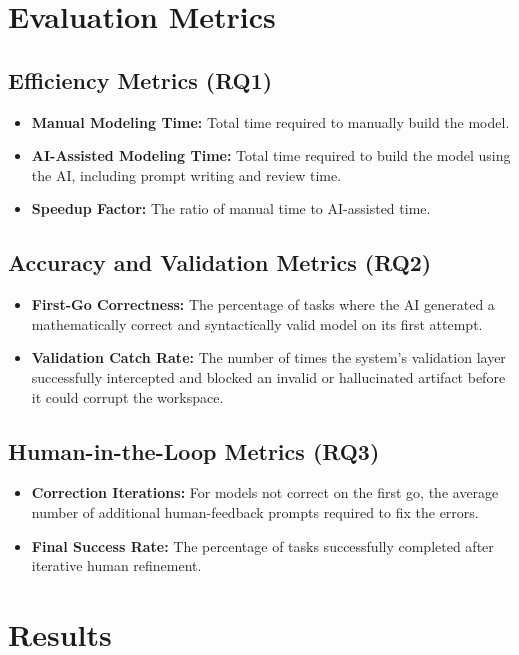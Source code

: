 \section{Evaluation Metrics}

\subsection{Efficiency Metrics (RQ1)}
\begin{itemize}
    \item \textbf{Manual Modeling Time:} Total time required to manually build the model.
    \item \textbf{AI-Assisted Modeling Time:} Total time required to build the model using the AI, including prompt writing and review time.
    \item \textbf{Speedup Factor:} The ratio of manual time to AI-assisted time.
\end{itemize}

\subsection{Accuracy and Validation Metrics (RQ2)}
\begin{itemize}
    \item \textbf{First-Go Correctness:} The percentage of tasks where the AI generated a mathematically correct and syntactically valid model on its first attempt.
    \item \textbf{Validation Catch Rate:} The number of times the system's validation layer successfully intercepted and blocked an invalid or hallucinated artifact before it could corrupt the workspace.
\end{itemize}

\subsection{Human-in-the-Loop Metrics (RQ3)}
\begin{itemize}
    \item \textbf{Correction Iterations:} For models not correct on the first go, the average number of additional human-feedback prompts required to fix the errors.
    \item \textbf{Final Success Rate:} The percentage of tasks successfully completed after iterative human refinement.
\end{itemize}

\section{Results}

